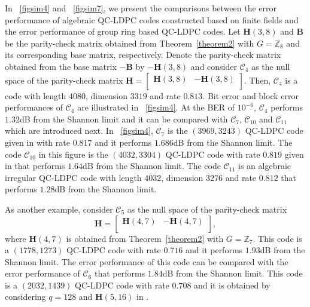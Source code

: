 \documentclass[journal,draftclsnofoot,onecolumn,12pt,twoside]{IEEEtran}
\begin{document}
\textcolor{mycolor}{In \figurename~\ref{figsim4} and \figurename~\ref{figsim7}, we present the comparisons between the error performance of algebraic QC-LDPC codes constructed based on finite fields \cite{QC_cyclic,C12,C10,C11,6} and the error performance of group ring based QC-LDPC codes. Let $\mathbf{H}(3,8)$  and $\mathbf{B}$ be the parity-check matrix obtained from Theorem~\ref{theorem2} with $G=\mathbb{Z}_8$ and its corresponding base matrix, respectively. Denote the parity-check matrix obtained from the base matrix $-\mathbf{B}$ by $-\mathbf{H}(3,8)$ and   consider $\mathcal{C}_4$ as the null space of the parity-check matrix $\mathbf{H}=\left[
                     \begin{array}{c|c}
                       \mathbf{H}(3,8) & -\mathbf{H}(3,8) \\
                     \end{array}
                   \right]$. Then, $\mathcal{C}_4$ is a code with length $4080$, dimension $3319$ and rate $0.813$. Bit error and block error performances of $\mathcal{C}_4$ are illustrated in \figurename~\ref{figsim4}. At the BER of $10^{-6}$, $\mathcal{C}_4$ performs  $1.32$dB from the Shannon limit and it can be compared with $\mathcal{C}_7$, $\mathcal{C}_{10}$ and $\mathcal{C}_{11}$ which are introduced next. In \figurename~\ref{figsim4}, $\mathcal{C}_7$ is the $(3969, 3243)$ QC-LDPC code given in \cite[Example 1]{QC_cyclic} with rate $0.817$ and it performs $1.686$dB from the Shannon limit. The code  $\mathcal{C}_{10}$ in this figure is the $(4032, 3304)$ QC-LDPC code with rate $0.819$ given in \cite[Example 4]{C10} that performs $1.64$dB from the Shannon limit. The code  $\mathcal{C}_{11}$ is an algebraic irregular QC-LDPC code \cite[Example 2]{C11} with length $4032$, dimension $3276$ and rate $0.812$ that performs $1.28$dB from the Shannon limit.}

\textcolor{mycolor}{As another example, consider $\mathcal{C}_5$ as the null space of the parity-check matrix $$\mathbf{H}=\left[
                     \begin{array}{c|c}
                       \mathbf{H}(4,7) & -\mathbf{H}(4,7) \\
                     \end{array}
                   \right],$$
where $\mathbf{H}(4,7)$ is obtained from Theorem~\ref{theorem2} with $G=\mathbb{Z}_7$. This code is a $(1778,1273)$ QC-LDPC code with rate $0.716$ and it performs $1.93$dB from the Shannon limit. The error performance of this code can be compared with the error performance of $\mathcal{C}_6$ that performs $1.84$dB from the Shannon limit. This code is a $(2032,1439)$ QC-LDPC code with rate $0.708$ and it is obtained by considering $q=128$ and $\mathbf{H}(5,16)$ in \cite[Example 1]{QC_cyclic}.}
\end{document}
